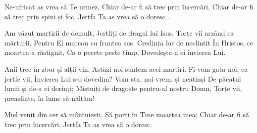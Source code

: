 \beginchorus
Ne-nfricat aș vrea să Te urmez,
Chiar de-ar fi să trec prin încercări,
Chiar de-ar fi să trec prin spini și foc,
Jertfa Ta aș vrea să o doresc...
\endchorus

\beginverse
Am văzut martirii de demult,
Jertfiți de dragul lui Isus,
Torțe vii arzând ca mărturii,
Pentru El mureau cu fruntea sus.
Credința lor de neclintit
În Hristos, ce moartea-a răstignit,
Ca o pecete peste timp,
Dovedește-n ei învierea Lui.
\endverse

\beginverse
Anii trec în zbor și alții vin,
Astăzi noi suntem acei martiri.
Fi-vom gata noi, ca jertfe vii,
Învierea Lui s-o dovedim?
Vom sta, noi vrem, și neatinși
De păcatul lumii și de-a ei dorinți;
Mistuiți de dragoste pentru-al nostru Domn,
Torțe vii, preasfinte, în lume să-nălțăm!
\endverse

\beginverse*
Miel venit din cer să mântuiești,
Să porți în Tine moartea mea;
Chiar de-ar fi să trec prin încercări,
Jertfa Ta aș vrea să o doresc.
\endverse
\endsong